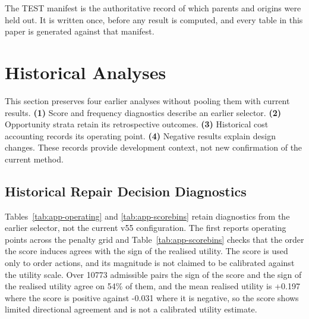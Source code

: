 \documentclass{article}
\begin{document}
The TEST manifest is the authoritative record of which parents and origins were held out. It
is written once, before any result is computed, and every table in this paper is generated
against that manifest.

\section{Historical Analyses}
\label{app:history}
This section preserves four earlier analyses without pooling them with current results. \textbf{(1)} Score and frequency diagnostics describe an earlier selector. \textbf{(2)} Opportunity strata retain its retrospective outcomes. \textbf{(3)} Historical cost accounting records its operating point. \textbf{(4)} Negative results explain design changes. These records provide development context, not new confirmation of the current method.

\subsection{Historical Repair Decision Diagnostics}
\label{app:governance-fig}
Tables~\ref{tab:app-operating} and \ref{tab:app-scorebins} retain diagnostics from the earlier selector, not the current v55 configuration. The first reports operating points across the penalty grid and
Table~\ref{tab:app-scorebins} checks that the order the score induces agrees with the sign of
the realised utility. The score is used only to order actions, and its magnitude is not claimed
to be calibrated against the utility scale. Over 10773 admissible pairs the sign of the score and the sign of the realised utility agree on 54\% of them, and the mean realised utility is +0.197 where the score is positive against -0.031 where it is negative, so the score shows limited directional agreement and is not a calibrated utility estimate.
\end{document}
